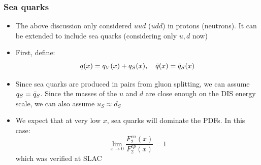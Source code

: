 \subsubsection{Sea quarks}
\begin{itemize}
  \item The above discussion only considered $uud$ ($udd$) in protons (neutrons). It can be extended to include sea quarks (considering only $u,d$ now)
  \item First, define:
  \begin{equation}
    q(x) = q_V(x) + q_S(x), \quad {\bar{q}}(x) = {\bar{q}}_S(x)
  \end{equation}
  \item Since sea quarks are produced in pairs from gluon splitting, we can assume $q_S = {\bar{q}}_S$. Since the masses of the $u$ and $d$ are close enough on the DIS energy scale, we can also assume $u_S \approx d_S$
  \item We expect that at very low $x$, sea quarks will dominate the PDFs. In this case:
  \begin{equation}
    \lim_{x\rightarrow 0} \frac{F_2^{en}(x)}{F_2^{ep}(x)} = 1
  \end{equation}
  which was verified at SLAC
\end{itemize}

